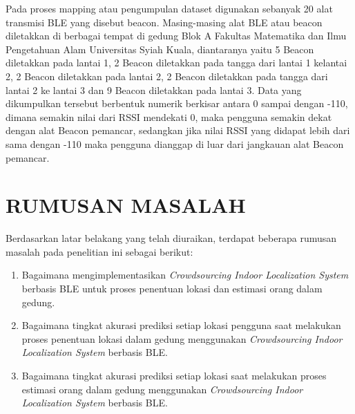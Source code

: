 \par Pada proses mapping atau pengumpulan dataset digunakan sebanyak 20 alat transmisi BLE yang disebut beacon. Masing-masing alat BLE atau beacon diletakkan di berbagai tempat di gedung Blok A Fakultas Matematika dan Ilmu Pengetahuan Alam Universitas Syiah Kuala, diantaranya yaitu  5 Beacon diletakkan pada lantai 1, 2 Beacon diletakkan pada tangga dari lantai 1 kelantai 2,  2 Beacon diletakkan pada lantai 2,  2 Beacon diletakkan pada tangga dari lantai 2 ke lantai 3 dan 9 Beacon diletakkan pada lantai 3. Data yang dikumpulkan  tersebut  berbentuk  numerik  berkisar  antara  0  sampai  dengan  -110, dimana semakin nilai dari RSSI mendekati 0, maka pengguna semakin dekat dengan alat Beacon  pemancar,  sedangkan  jika  nilai  RSSI  yang  didapat  lebih  dari  sama dengan -110 maka pengguna dianggap di luar dari jangkauan alat Beacon pemancar.

\par

\fancyhf{}
\fancyfoot[R]{\thepage}

\section{\uppercase{RUMUSAN MASALAH}}
Berdasarkan latar belakang yang telah diuraikan, terdapat beberapa rumusan masalah pada penelitian ini sebagai berikut:
\begin{enumerate}
	\item Bagaimana mengimplementasikan \textit{Crowdsourcing Indoor Localization System} berbasis BLE untuk proses penentuan lokasi dan estimasi orang dalam gedung.
	\item Bagaimana tingkat akurasi prediksi setiap lokasi pengguna saat melakukan proses  penentuan lokasi dalam gedung menggunakan \textit{Crowdsourcing Indoor Localization System} berbasis BLE.
	\item Bagaimana tingkat akurasi prediksi setiap lokasi saat melakukan proses estimasi orang dalam gedung menggunakan \textit{Crowdsourcing Indoor Localization System} berbasis BLE.

\end{enumerate}

